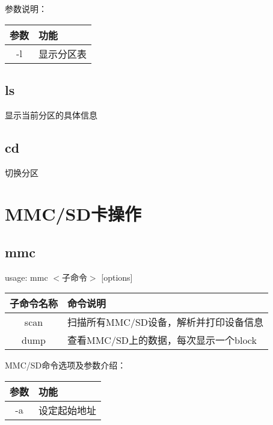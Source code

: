 参数说明：

\begin{table}[H]
\begin{tabular}{|c|l|}
\hline
参数 & 功能 \\ \hline
-l & 显示分区表 \\ \hline
\end{tabular}
\end{table}

\subsection{ls}
显示当前分区的具体信息

\subsection{cd}
切换分区

\section{MMC/SD卡操作}
\subsection{mmc}
usage: mmc $<$子命令$>$ [options]

\begin{table}[H]
\setlength{\parindent}{0pt}
\begin{tabular}{|c|l|} \hline
子命令名称 & 命令说明 \\ \hline
scan & 扫描所有MMC/SD设备，解析并打印设备信息 \\ \hline
dump & 查看MMC/SD上的数据，每次显示一个block \\ \hline
\end{tabular}
\end{table}

MMC/SD命令选项及参数介绍：
\begin{table}[H]
\setlength{\parindent}{0pt}
\begin{tabular}{|c|l|} \hline
参数 & 功能 \\ \hline
-a & 设定起始地址\\ \hline
\end{tabular}
\end{table}

